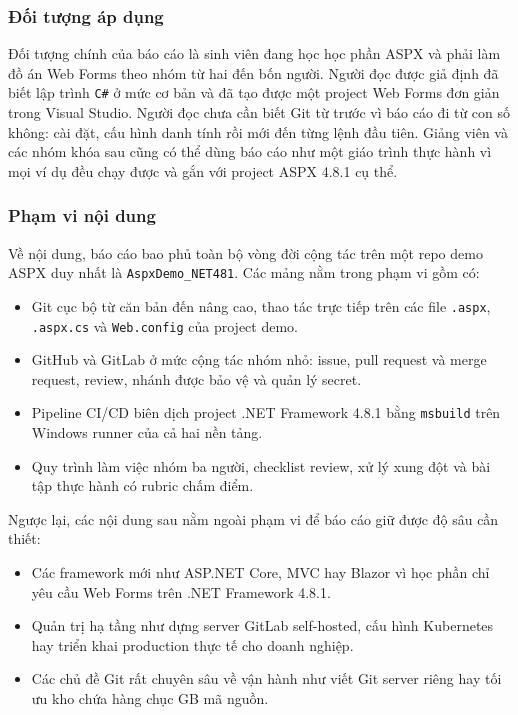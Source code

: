\subsubsection{Đối tượng áp dụng}

Đối tượng chính của báo cáo là sinh viên đang học học phần ASPX và phải làm đồ án Web Forms theo nhóm từ hai đến bốn người.
Người đọc được giả định đã biết lập trình \texttt{C\#} ở mức cơ bản và đã tạo được một project Web Forms đơn giản trong Visual Studio.
Người đọc chưa cần biết Git từ trước vì báo cáo đi từ con số không: cài đặt, cấu hình danh tính rồi mới đến từng lệnh đầu tiên.
Giảng viên và các nhóm khóa sau cũng có thể dùng báo cáo như một giáo trình thực hành vì mọi ví dụ đều chạy được và gắn với project ASPX 4.8.1 cụ thể.

\subsubsection{Phạm vi nội dung}

Về nội dung, báo cáo bao phủ toàn bộ vòng đời cộng tác trên một repo demo ASPX duy nhất là \texttt{AspxDemo\_NET481}.
Các mảng nằm trong phạm vi gồm có:
\begin{itemize}
\item Git cục bộ từ căn bản đến nâng cao, thao tác trực tiếp trên các file \texttt{.aspx}, \texttt{.aspx.cs} và \texttt{Web.config} của project demo.
\item GitHub và GitLab ở mức cộng tác nhóm nhỏ: issue, pull request và merge request, review, nhánh được bảo vệ và quản lý secret.
\item Pipeline CI/CD biên dịch project .NET Framework 4.8.1 bằng \verb|msbuild| trên Windows runner của cả hai nền tảng.
\item Quy trình làm việc nhóm ba người, checklist review, xử lý xung đột và bài tập thực hành có rubric chấm điểm.
\end{itemize}
Ngược lại, các nội dung sau nằm ngoài phạm vi để báo cáo giữ được độ sâu cần thiết:
\begin{itemize}
\item Các framework mới như ASP.NET Core, MVC hay Blazor vì học phần chỉ yêu cầu Web Forms trên .NET Framework 4.8.1.
\item Quản trị hạ tầng như dựng server GitLab self-hosted, cấu hình Kubernetes hay triển khai production thực tế cho doanh nghiệp.
\item Các chủ đề Git rất chuyên sâu về vận hành như viết Git server riêng hay tối ưu kho chứa hàng chục GB mã nguồn.
\end{itemize}

